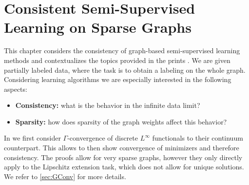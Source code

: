 \chapter{Consistent Semi-Supervised Learning on Sparse Graphs}\label{ch:SSL}

This chapter considers the consistency of graph-based semi-supervised learning methods and contextualizes the topics provided in the prints \cite{roith2022continuum, bungert2021uniform, bungert2022ratio}. We are given partially labeled data, where the task is to obtain a labeling on the  whole graph. Considering learning algorithms we are especially interested in the following aspects:
%
\begin{itemize}
\item \textbf{Consistency:} what is the behavior in the infinite data limit?
\item \textbf{Sparsity:} how does sparsity of the graph weights affect this behavior?
\end{itemize}
%
%
%
\begin{center}%
\end{center}
%
In \cite{roith2022continuum} we first consider $\Gamma$-convergence of discrete $L^\infty$ functionals to their continuum counterpart. This allows to then show convergence of minimizers and therefore consistency. The proofs allow for very sparse graphs, however they only directly apply to the Lipschitz extension task, which does not allow for unique solutions. We refer to \cref{sec:GConv} for more details.

